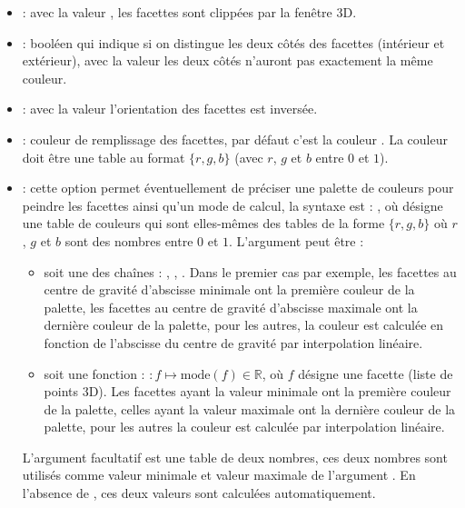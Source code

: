\begin{itemize}
    \item {} : avec la valeur \true, les facettes sont clippées par la fenêtre 3D.
    
    \item {} : booléen qui indique si on distingue les deux côtés des facettes (intérieur et extérieur), avec la valeur \true les deux côtés n'auront pas exactement la même couleur.
    
    \item {} : avec la valeur \true l'orientation des facettes est inversée.
    
    \item {} : couleur de remplissage des facettes, par défaut c'est la couleur . La couleur doit être une table au format $\{r,g,b\}$ (avec $r$, $g$ et $b$ entre $0$ et $1$).
  
    \item {} : cette option permet éventuellement de préciser une palette de couleurs pour peindre les facettes ainsi qu'un mode de calcul, la syntaxe est : , où  désigne une table de couleurs qui sont elles-mêmes des tables de la forme $\{r,g,b\}$ où $r$, $g$ et $b$ sont des nombres entre $0$ et $1$. L'argument   peut être :
        \begin{itemize}
            \item soit une des chaînes : , , . Dans le premier cas par exemple, les facettes au centre de gravité d'abscisse minimale ont la première couleur de la palette, les facettes au centre de gravité d'abscisse maximale ont la dernière couleur de la palette, pour les autres, la couleur est calculée en fonction de l'abscisse du centre de gravité par interpolation linéaire.
            
            \item soit une fonction : $\colon f \mapsto \mathrm{mode}(f)\in\mathbb R$, où $f$ désigne une facette (liste de points 3D). Les facettes ayant la valeur minimale ont la première couleur de la palette, celles ayant la valeur maximale ont la dernière couleur de la palette, pour les autres la couleur est calculée par interpolation linéaire.
        \end{itemize}    
    L'argument facultatif  est une table de deux nombres, ces deux nombres sont utilisés comme valeur minimale et valeur maximale de l'argument . En l'absence de , ces deux valeurs sont calculées automatiquement.
\end{itemize}

